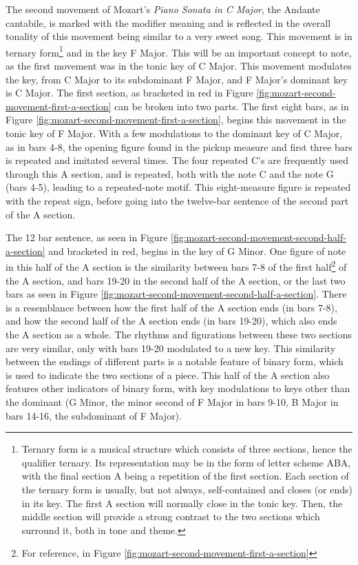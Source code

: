 The second movement of Mozart's \textit{Piano Sonata in C Major}, the Andante cantabile, is marked with the modifier  meaning  and is reflected in the overall tonality of this movement being similar to a very sweet song. This movement is in ternary form\footnote{Ternary form is a musical structure which consists of three sections, hence the qualifier ternary. Its representation may be in the form of letter scheme ABA, with the final section A being a repetition of the first section. Each section of the ternary form is usually, but not always, self-contained and closes (or ends) in its key. The first A section will normally close in the tonic key. Then, the middle section will provide a strong contrast to the two sections which surround it, both in tone and theme.} and in the key F Major. This will be an important concept to note, as the first movement was in the tonic key of C Major. This movement modulates the key, from C Major to its subdominant F Major, and F Major's dominant key is C Major. The first  section, as bracketed in red in Figure \ref{fig:mozart-second-movement-first-a-section}\autocite{Henle_1977} can be broken into two parts. The first eight bars, as in Figure \ref{fig:mozart-second-movement-first-a-section}\autocite{Henle_1977}, begins this movement in the tonic key of F Major. With a few modulations to the dominant key of C Major, as in bars 4-8, the opening figure found in the pickup measure and first three bars is repeated and imitated several times. The four repeated C's are frequently used through this A section, and is repeated, both with the note C and the note G (bars 4-5), leading to a repeated-note motif. This eight-measure figure is repeated with the repeat sign, before going into the twelve-bar sentence of the second part of the A section. 

The 12 bar sentence, as seen in Figure \ref{fig:mozart-second-movement-second-half-a-section}\autocite{Henle_1977} and bracketed in red, begins in the key of G Minor. One figure of note in this half of the A section is the similarity between bars 7-8 of the first half\footnote{For reference, in Figure \ref{fig:mozart-second-movement-first-a-section}} of the A section, and bars 19-20 in the second half of the A section, or the last two bars as seen in Figure \ref{fig:mozart-second-movement-second-half-a-section}\autocite{Henle_1977}. There is a resemblance between how the first half of the A section ends (in bars 7-8), and how the second half of the A section ends (in bars 19-20), which also ends the A section as a whole. The rhythms and figurations between these two sections are very similar, only with bars 19-20 modulated to a new key. This similarity between the endings of different parts is a notable feature of binary form\autocite{Sutcliffe_Tilmouth_2001}, which is used to indicate the two sections of a piece. This half of the A section also features other indicators of binary form, with key modulations to keys other than the dominant (G Minor, the minor second of F Major in bars 9-10, B\musFlat{} Major in bars 14-16, the subdominant of F Major).


